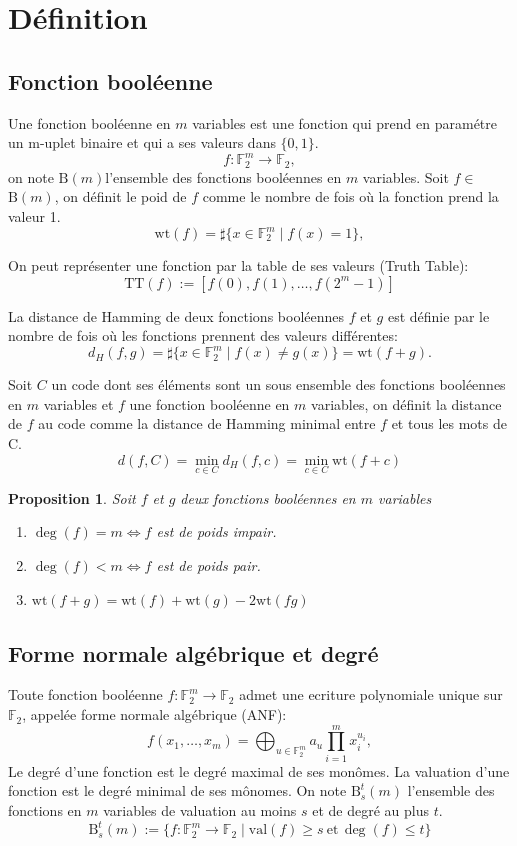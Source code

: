 \documentclass{article}
\def\FF{\ensuremath{\mathbb{F}}}
\def\WT#1{\ensuremath{\mathrm{wt}(#1)}}
\def\BM{\ensuremath{\mathrm{B}(m)}}
\def\BST#1#2#3{\ensuremath{\mathrm{B}_#1^#2(#3)}}
\newtheorem{proposition}{Proposition}
\begin{document}
\tableofcontents

\cite{gao2026}
\section{Définition}
\subsection{Fonction booléenne}
Une fonction booléenne en $m$ variables est une fonction qui prend en paramétre un m-uplet binaire et qui a ses valeurs dans $\{0, 1\}$.
$$ f : \mathbb{F}_2^m \to \mathbb{F}_2 ,$$
on note \BM l'ensemble des fonctions booléennes en $m$ variables.
Soit $f \in$ \BM, on définit le poid de $f$ comme le nombre de fois où la fonction prend la valeur 1.
$$ \mathrm{wt}(f) = \sharp\{x \in \mathbb{F}_2^m \mid f(x) = 1 \}, $$

On peut représenter une fonction par la table de ses valeurs (Truth Table):
$$ \textrm{TT}(f) := [f(0), f(1), \dots, f(2^m-1)] $$

La distance de Hamming de deux fonctions booléennes $f$ et $ g$ est définie par le nombre de fois où les fonctions prennent des valeurs différentes:
$$ d_H(f, g) = \sharp \{x \in \mathbb{F}_2^m \mid f(x) \neq g(x)\} = \WT{f+g}.$$

Soit $C$ un code dont ses éléments sont un sous ensemble des fonctions booléennes en $m$ variables et $f$ une fonction booléenne en $m$ variables, on définit la distance de $f$ au code comme
la distance de Hamming minimal entre $f$ et tous les mots de C.
$$d(f, C) = \min_{c \in C} d_H(f, c) = \min_{c \in C} \WT{f+c}$$
\begin{proposition}
	Soit $f$ et $g$ deux fonctions booléennes en $m$ variables
	\begin{enumerate}[label=(\roman*)]
		\item $\deg(f) = m \Longleftrightarrow f$ est de poids impair.
		\item $\deg(f) < m \Longleftrightarrow f$ est de poids pair.
		\item $\WT{f+g} = \WT{f} + \WT{g} - 2\WT{fg}$
	\end{enumerate}
\end{proposition}

\subsection{Forme normale algébrique et degré}
Toute fonction booléenne $f : \FF_2^m \to \FF_2$ admet une ecriture polynomiale unique sur $\FF_2$, appelée forme normale algébrique (ANF):
\[
f(x_1,\dots,x_m)
=
\bigoplus_{u \in \mathbb{F}_2^m}
a_u \prod_{i=1}^m x_i^{u_i},
\]
Le degré d'une fonction est le degré maximal de ses monômes. La valuation d'une fonction est le degré minimal de ses mônomes.
On note $\BST{s}{t}{m}$ l'ensemble des fonctions en $m$ variables de valuation au moins $s$ et de degré au plus $t$.
$$
\BST{s}{t}{m} := \{f: \mathbb{F}_2^m \to \FF_2 \mid \mathrm{val}(f) \geq s \ \text{et} \, \deg(f) \leq t\}
$$
\end{document}
